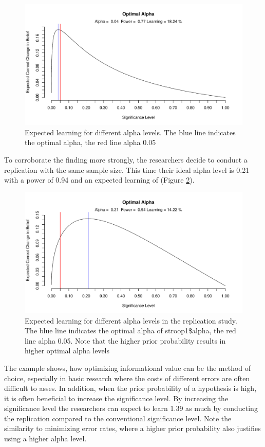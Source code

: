 \documentclass[
  english,
  ,jou,floatsintext]{apa6}
\begin{document}
\begin{figure}
\centering
\includegraphics{Justify_in_Practice_files/figure-latex/idealalpha1-1.pdf}
\caption{\label{fig:idealalpha1}Expected learning for different alpha levels. The blue line indicates the optimal alpha, the red line alpha 0.05}
\end{figure}

To corroborate the finding more strongly, the researchers decide to conduct a replication with the same sample size. This time their ideal alpha level is 0.21 with a power of 0.94 and an expected learning of (Figure \ref{fig:idealalpha2}).

\begin{figure}
\centering
\includegraphics{Justify_in_Practice_files/figure-latex/idealalpha2-1.pdf}
\caption{\label{fig:idealalpha2}Expected learning for different alpha levels in the replication study. The blue line indicates the optimal alpha of stroop1\$alpha, the red line alpha 0.05. Note that the higher prior probability results in higher optimal alpha levels}
\end{figure}

The example shows, how optimizing informational value can be the method of choice, especially in basic research where the costs of different errors are often difficult to asses. In addition, when the prior probability of a hypothesis is high, it is often beneficial to increase the significance level. By increasing the significance level the researchers can expect to learn 1.39 as much by conducting the replication compared to the conventional significance level. Note the similarity to minimizing error rates, where a higher prior probability also justifies using a higher alpha level.
\end{document}
